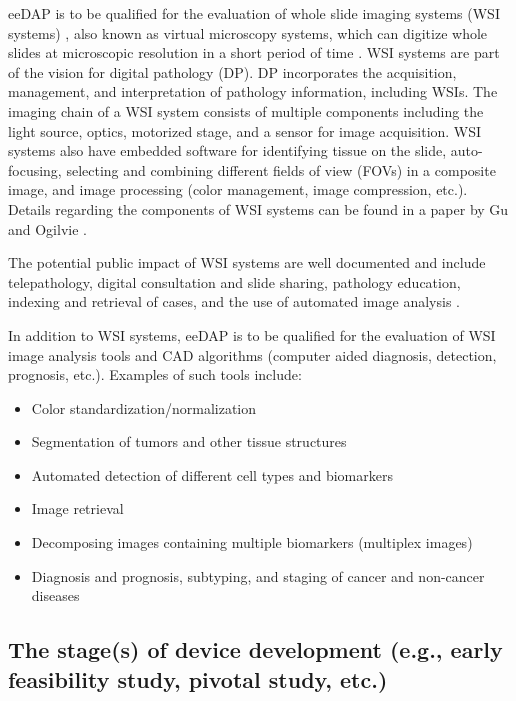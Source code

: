 \documentclass{article}%
\begin{document}
eeDAP is to be qualified for the evaluation of whole slide imaging systems
(WSI systems) , also known as virtual microscopy systems, which can digitize
whole slides at microscopic resolution in a short period of time
\cite{Rojo2006_Int-J-Surg-Pathol_v14p285}. WSI systems are part of the vision
for digital pathology (DP). DP incorporates the acquisition, management, and
interpretation of pathology information, including WSIs. The imaging chain of
a WSI system consists of multiple components including the light source,
optics, motorized stage, and a sensor for image acquisition. WSI systems also
have embedded software for identifying tissue on the slide, auto-focusing,
selecting and combining different fields of view (FOVs) in a composite image,
and image processing (color management, image compression, etc.). Details
regarding the components of WSI systems can be found in a paper by Gu and
Ogilvie \cite{Gu2005_book}.

The potential public impact of WSI systems are well documented and include
telepathology, digital consultation and slide sharing, pathology education,
indexing and retrieval of cases, and the use of automated image analysis
\cite{Pantanowitz2011_J-Pathol-Inform_v2p36,
Weinstein2009_Hum-Pathol_v40p1057, Al-Janabi2012_Histopathology_v61p1}.

In addition to WSI systems, eeDAP is to be qualified for the evaluation of WSI
image analysis tools and CAD algorithms (computer aided diagnosis, detection,
prognosis, etc.). Examples of such tools include:

\begin{itemize}
\item Color standardization/normalization

\item Segmentation of tumors and other tissue structures

\item Automated detection of different cell types and biomarkers

\item Image retrieval

\item Decomposing images containing multiple biomarkers (multiplex images)

\item Diagnosis and prognosis, subtyping, and staging of cancer and non-cancer diseases
\end{itemize}

\subsection{The stage(s) of device development (e.g., early feasibility study,
pivotal study, etc.)}
\end{document}
